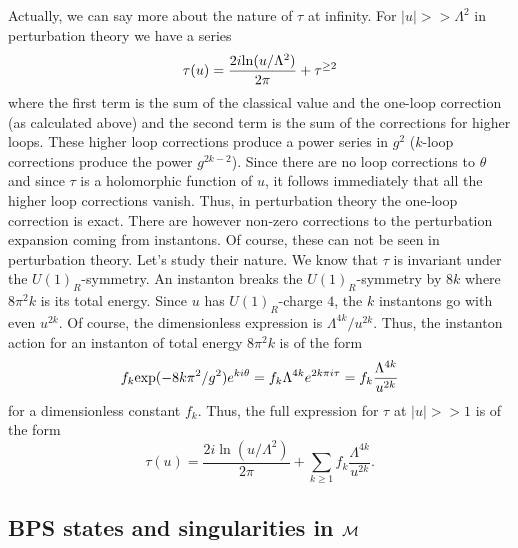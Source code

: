 \documentclass[10pt]{article}
\begin{document}
Actually, we can say more about the nature of $\tau$ at infinity. 
For $|u|>>\Lambda^2$ in perturbation theory we have a series
\begin{equation}\label{tau3}
\tau(u)= \frac{2i{\rm ln}(u/\Lambda^2)}{2\pi} + \tau^{\ge 2}
\end{equation}
where the first term is the sum of the classical value and the
one-loop correction  (as calculated above) and the second term 
is the sum of the corrections for higher loops.
These higher loop corrections produce a power series in $g^2$
($k$-loop corrections produce the power $g^{2k-2}$).  Since there are
no loop corrections to $\theta$ and since $\tau$ is a holomorphic
function of $u$, it follows immediately that all the higher loop
corrections vanish.
Thus, in 
perturbation theory the one-loop correction is exact.  There are
however non-zero corrections to the perturbation expansion coming from
instantons. Of course, 
these can not be seen in perturbation theory. Let's study their
nature. We know that $\tau$ is invariant under the $U(1)_R$-symmetry.
An instanton breaks the  
$U(1)_R$-symmetry by $8k$ where $8\pi^2k$ is its total energy.
Since $u$ has $U(1)_R$-charge $4$, the $k$ instantons go with even
$u^{2k}$. Of course, the dimensionless expression is  
$\Lambda^{4k}/u^{2k}$.    
Thus,  the instanton action for an instanton of total energy $8\pi^2k$
is of the form
$$f_k{\rm exp}(-8k\pi^2/g^2)e^{ki\theta}=
f_k\Lambda^{4k}e^{2k\pi i\tau}=f_k\frac{\Lambda^{4k}}{u^{2k}}$$
for a dimensionless constant $f_k$.
Thus, the full expression for $\tau$
at $|u|>>1$ is of the form 
\begin{equation}\label{tau4}
\tau(u)=\frac{2i{\ln}(u/\Lambda^2)}{2\pi} +\sum_{k\ge
1}f_k\frac{\Lambda^{4k}}{u^{2k}}.
\end{equation}





 \subsection{BPS states and singularities in ${\cal M}$}
\end{document}
